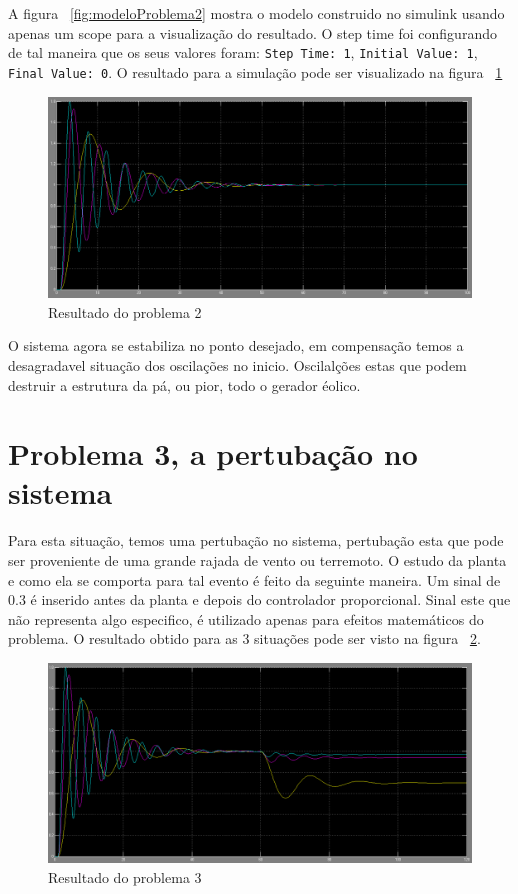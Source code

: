 \documentclass[a4paper, 10pt]{article}
\begin{document}
A figura ~\ref{fig:modeloProblema2} mostra o modelo construido no simulink usando apenas um scope para a visualização do resultado. O step time foi configurando de tal maneira que os seus valores foram: \texttt{Step Time: 1}, \texttt{Initial Value: 1}, \texttt{Final Value: 0}.
O resultado para a simulação pode ser visualizado na figura ~\ref{fig:resultadoProblema2}

\begin{figure}[!ht]
	\centering
	\includegraphics[scale=.3]{fq2.png}
    \caption{Resultado do problema 2}
    \label{fig:resultadoProblema2}
\end{figure}

O sistema agora se estabiliza no ponto desejado, em compensação temos a desagradavel situação dos oscilações no inicio. Oscilalções estas que podem
destruir a estrutura da pá, ou pior, todo o gerador éolico.

\section{Problema 3, a pertubação no sistema}

Para esta situação, temos uma pertubação no sistema, pertubação esta que pode ser proveniente de uma grande rajada de vento ou terremoto. O estudo da planta
e como ela se comporta para tal evento é feito da seguinte maneira. Um sinal
de 0.3 é inserido antes da planta e depois do controlador proporcional. Sinal este que não representa algo especifico, é utilizado apenas para efeitos matemáticos do problema. 
O resultado obtido para as 3 situações pode ser visto na figura ~\ref{fig:resultadoProblema3}.

\begin{figure}[!ht]
	\centering
	\includegraphics[scale=.3]{rq3.png}
    \caption{Resultado do problema 3}
    \label{fig:resultadoProblema3}
\end{figure}
\end{document}
